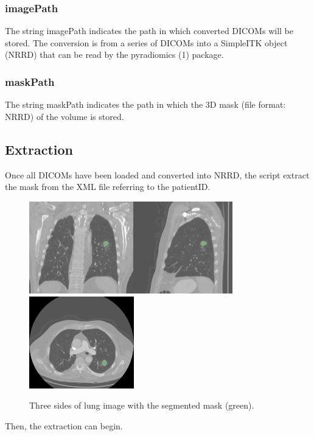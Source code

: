 \documentclass[12pt]{article}
\begin{document}
	\subsubsection{imagePath}
The string imagePath indicates the path in which converted DICOMs will be stored.
The conversion is from a series of DICOMs into a SimpleITK object (NRRD) that can be read by the pyradiomics (1) package.

	\subsubsection{maskPath}
The string maskPath indicates the path in which the 3D mask (file format: NRRD) of the volume is stored.

	\subsection{Extraction}
Once all DICOMs have been loaded and converted into NRRD, the script extract the mask from the XML file referring to the patientID.

\begin{figure}[htp]

\centering
\includegraphics[width=.3\textwidth, height = 4cm]{LUNG1}\includegraphics[width=.3\textwidth,  height = 4cm]{LUNG2}\includegraphics[width=.3\textwidth,  height = 4cm]{LUNG3}

\caption{Three sides of lung image with the segmented mask (green).}

\end{figure}
Then, the extraction can begin.
\end{document}
